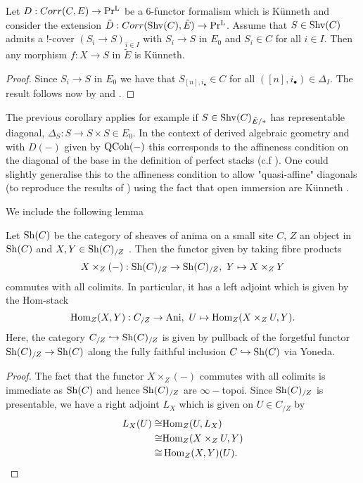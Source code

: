 \begin{theorem}\label{Künnethextension-main corollary}
    Let $D: Corr(C,E) \to \operatorname{Pr^{L}}$ be a $6$-functor formalism which is Künneth and consider the extension $\tilde{D}: Corr(\operatorname{Shv}(C),\tilde{E})\to \operatorname{Pr^{L}}$. Assume that $S\in \operatorname{Shv}(C)$ admits a $!$-cover $(S_i\to S)_{i\in I}$ with $S_i \to S$ in $E_0$ and $S_i \in C$ for all $i\in I$. Then any morphism $f : X \to S$ in $\tilde{E}$ is Künneth.
\end{theorem}
\begin{proof}
Since $S_i \to S$ in $E_0$ we have that $S_{[n],i_\bullet}\in C$ for all $([n],i_\bullet) \in \Delta_I$. The result follows now by  and . 
\end{proof}
\begin{remark}
   The previous corollary applies for example if $S \in \operatorname{Shv}(C)_{\tilde{E}/\ast}$ has representable diagonal, $\Delta_S : S \to S \times S \in E_0$. In the context of derived algebraic geometry and with $D(-)$ given by $\operatorname{QCoh}(-)$ this  corresponds to the affineness condition on the diagonal of the base in the definition of perfect stacks (c.f \Cite[Definition. 3.2]{ben2010integral}). One could slightly generalise this to the affineness condition to allow "quasi-affine" diagonals (to reproduce the results of \Cite[Theorem 1.0,3]{stefanich2023tannaka}) using the fact that open immersion are Künneth .
\end{remark}
We include the following lemma
\begin{lemma}\label{fibreproductcommutes with colimits}
    Let $\operatorname{Sh}(C)$ be the category of sheaves of anima on a small site $C$, $Z$ an object in $\operatorname{Sh}(C)$ and $X,Y\in \operatorname{Sh}(C)_{/Z}$ . Then the functor given by taking fibre products
\[
X\times_Z (-) : \operatorname{Sh}(C)_{/Z} \to \operatorname{Sh}(C)_{/Z} ,  \ Y \mapsto X\times_Z Y
\]
commutes with all colimits. In particular, it has a left adjoint which is given by the Hom-stack  
\[
\operatorname{{Hom}}_Z(X,Y) : C_{/Z} \to \operatorname{Ani} ,  \ U \mapsto \text{Hom}_Z(X \times_Z U,Y).
\]
Here, the category $C_{/Z} \hookrightarrow \operatorname{Sh}(C)_{/Z}$ is given by pullback of the forgetful functor $\operatorname{Sh}(C)_{/Z}\to \operatorname{Sh}(C)$ along the fully faithful inclusion $C \hookrightarrow \operatorname{Sh}(C)$ via Yoneda.
\end{lemma}
\begin{proof}
The fact that the functor $X\times_Z (-)$ commutes with all colimits is immediate as $\operatorname{Sh}(C)$ and hence $\operatorname{Sh}(C)_{/Z}$ are $\infty-$topoi. Since $\operatorname{Sh}(C)_{/Z}$ is presentable, we have a right adjoint $L_X$ which is given on  $U\in C_{/Z}$ by
\begin{align*}
L_X(U)\cong & \text{Hom}_Z(U, L_X) \\
\cong & \text{Hom}_Z(X \times_Z U,Y) \\
\cong & \operatorname{{Hom}}_Z(X,Y)(U).
\end{align*}
\end{proof}

